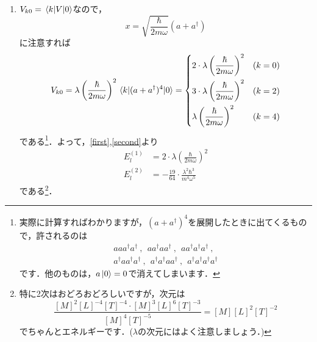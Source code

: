 \documentclass[a4paper,pdflatex,ja=standard]{bxjsarticle}
\begin{document}
\begin{enumerate}
\begin{enumerate}
    \item 
    $V_{k0}=\ev*{k|V|0}$なので，
    \begin{equation}
      x
      =
      \sqrt{\frac{\hbar}{2m\omega}}(a+a^{\dagger})
    \end{equation}
    に注意すれば
    \begin{equation}
      V_{k0}
      =
      \lambda\left( \frac{\hbar}{2m\omega} \right)^2
      \ev*{k|(a+a^{\dagger})^4|0}
      =
      \begin{dcases}
        2\cdot\lambda\left( \frac{\hbar}{2m\omega} \right)^2
        &(k=0)
        \\
        3\cdot\lambda\left( \frac{\hbar}{2m\omega} \right)^2
        &(k=2)
        \\
        \lambda\left( \frac{\hbar}{2m\omega} \right)^2
        &(k=4)
      \end{dcases}
    \end{equation}
    である\footnote{実際に計算すればわかりますが，$(a+a^{\dagger})^4$を展開したときに出てくるもので，許されるのは
    \begin{gather}
      aaa^{\dagger}a^{\dagger}
      \ ,\ \ 
      aa^{\dagger}aa^{\dagger}
      \ ,\ \ 
      aa^{\dagger}a^{\dagger}a^{\dagger}
      \ , 
      \nonumber\\
      a^{\dagger}aa^{\dagger}a^{\dagger}
      \ ,\ \ 
      a^{\dagger}a^{\dagger}aa^{\dagger}
      \ ,\ \ 
      a^{\dagger}a^{\dagger}a^{\dagger}a^{\dagger}
      \nonumber
    \end{gather}
    です．他のものは，$a\ket{0}=0$で消えてしまいます．}．よって，\eqref{first},\eqref{second}より
    \begin{align}
      E_{l}^{(1)}
      &=
      2\cdot\lambda\left( \frac{\hbar}{2m\omega} \right)^2
      \\
      E_{l}^{(2)}
      &=
      -\frac{19}{64}\cdot\frac{\lambda^2\hbar^3}{m^4\omega^5}
    \end{align}
    である\footnote{特に2次はおどろおどろしいですが，次元は
    \begin{equation}
      \frac{[M]^{2}[L]^{-4}[T]^{-4}\cdot[M]^{3}[L]^{6}[T]^{-3}}{[M]^{4}[T]^{-5}}
      =
      [M][L]^{2}[T]^{-2}
      \nonumber
    \end{equation}
    でちゃんとエネルギーです．($\lambda$の次元にはよく注意しましょう．)}．
  \end{enumerate}


\end{enumerate}
\end{document}
